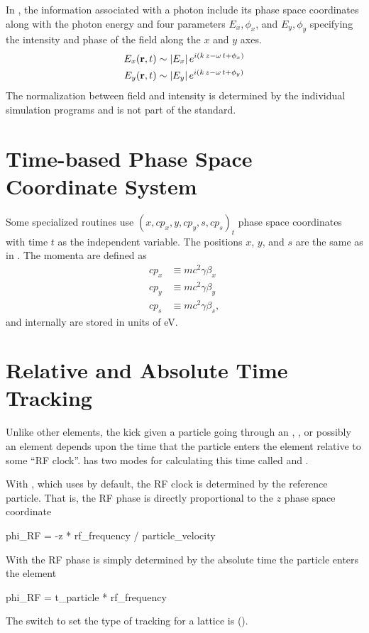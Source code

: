 In \bmad, the information associated with a photon include its phase
space coordinates along with the photon energy and four parameters
$E_x, \phi_x$, and $E_y, \phi_y$ specifying the intensity and phase of
the field along the $x$ and $y$ axes.
\begin{align}
  E_x ({\bf r}, t) &\sim |E_x| \, e^{i (k \, z - \omega \, t + \phi_x)} \nonumber \\
  E_y ({\bf r}, t) &\sim |E_y| \, e^{i (k \, z - \omega \, t + \phi_y)} \nonumber \\
\end{align}
The normalization between field and intensity is determined by the
individual simulation programs and is not part of the \bmad standard.

\section{Time-based Phase Space Coordinate System}
\label{s:time.phase.space}

Some specialized routines use $(x, c p_x, y, c p_y, s, c p_s)_t$ phase
space coordinates with time $t$ as the independent variable. The
positions $x$, $y$, and $s$ are the same as in
. The momenta are defined as
\begin{align}
c p_x &\equiv m c^2 \gamma \beta_x \\
c p_y &\equiv m c^2 \gamma \beta_y \\
c p_s &\equiv m c^2 \gamma \beta_s,
\end{align}
and internally are stored in units of eV.

\section{Relative and Absolute Time Tracking}
\label{s:rf.time}

Unlike other elements, the kick given a particle going through an
, , or possibly an  element
depends upon the time that the particle enters the element relative to
some ``RF clock''. \bmad has two modes for calculating this time
called  and .

With , which \bmad uses by default, the RF
clock is determined by the reference particle. That is, the RF phase
is directly proportional to the $z$ phase space coordinate
\begin{example}
  phi_RF = -z * rf_frequency / particle_velocity
\end{example}
With  the RF phase is simply determined by the 
absolute time the particle enters the element
\begin{example}
  phi_RF = t_particle * rf_frequency
\end{example}
The switch to set the type of tracking for a lattice is
 ().

